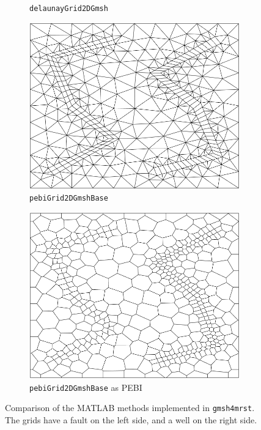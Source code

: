 \begin{figure}[p]
\begin{subfigure}[b]{0.49\textwidth}
        \caption{\texttt{delaunayGrid2DGmsh}}
        \label{fig:delaunayGrid2DGmsh}
    \end{subfigure}
    \begin{subfigure}[b]{0.49\textwidth}
        \centering
        \includegraphics[width=\textwidth]{report/Images/Combining software/Demo gmsh4mrst MATLAB/demo_pebiGrid2DGmshBase.png}
        \caption{\texttt{pebiGrid2DGmshBase}}
        \label{fig:pebiGrid2DGmshBase}
    \end{subfigure}
    \begin{subfigure}[b]{0.49\textwidth}
        \centering
        \includegraphics[width=\textwidth]{report/Images/Combining software/Demo gmsh4mrst MATLAB/demo_pebiGrid2DGmshBase_PEBI.png}
        \caption{\texttt{pebiGrid2DGmshBase} as PEBI}
        \label{fig:pebiGrid2DGmshBase_PEBI}
    \end{subfigure}
    \caption[Comparison of the MATLAB methods implemented in \texttt{gmsh4mrst}]{Comparison of the MATLAB methods implemented in \texttt{gmsh4mrst}. The grids have a fault on the left side, and a well on the right side.}
    \label{fig:gmsh4mrst-MATLABmethods}
\end{figure}


